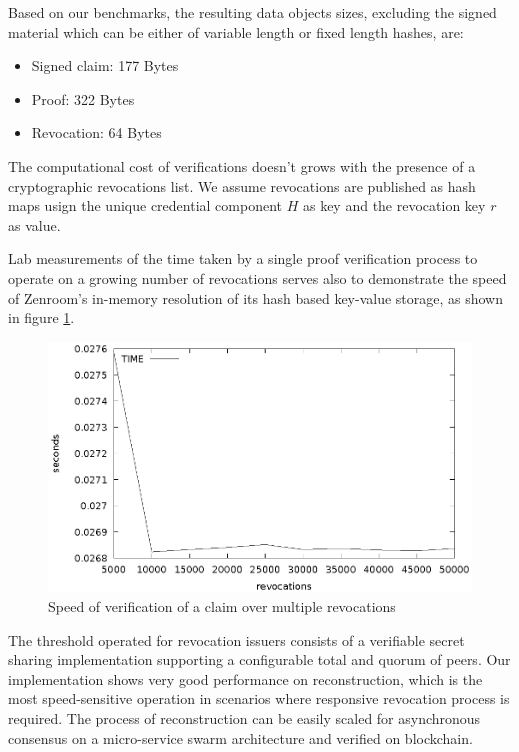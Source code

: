 Based on our benchmarks, the resulting data objects sizes, excluding
the signed material which can be either of variable length or fixed
length hashes, are:
\begin{itemize}
    \item Signed claim: 177 Bytes
    \item Proof:  322 Bytes
    \item Revocation: 64 Bytes
\end{itemize}

The computational cost of verifications doesn't grows with the
presence of a cryptographic revocations list. We assume revocations
are published as hash maps usign the unique credential component $H$
as key and the revocation key $r$ as value.

Lab measurements of the time taken by a single proof verification
process to operate on a growing number of revocations serves also to
demonstrate the speed of Zenroom's in-memory resolution of its hash
based key-value storage, as shown in figure
\ref{fig:verifyrevocations}.

\begin{figure}
    \centering
    \includegraphics[width=1\linewidth]{verifyrevocations.eps}

    \caption{Speed of verification of a claim over multiple revocations}
    \label{fig:verifyrevocations}
\end{figure}

The threshold operated for revocation issuers consists of a verifiable
secret sharing implementation supporting a configurable total and
quorum of peers. Our implementation shows very good performance on
reconstruction, which is the most speed-sensitive operation in
scenarios where responsive revocation process is required. The process
of reconstruction can be easily scaled for asynchronous consensus on a
micro-service swarm architecture and verified on blockchain.

